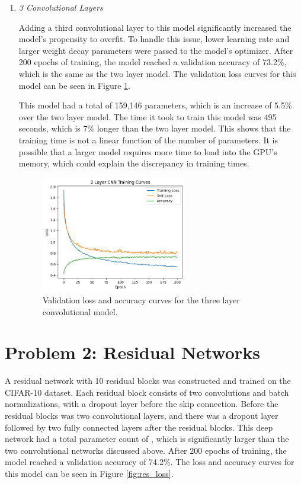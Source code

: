 \documentclass{article}
\begin{document}
\begin{enumerate}[label=\alph*. ]
     \item \textit{3 Convolutional Layers}

     Adding a third convolutional layer to this model significantly increased the model's propensity to overfit. To handle this issue, lower learning rate and larger weight decay parameters were passed to the model's optimizer. After 200 epochs of training, the model reached a validation accuracy of 73.2\%, which is the same as the two layer model. The validation loss curves for this model can be seen in Figure \ref{fig:conv_loss_b}.

     This model had a total of 159,146 parameters, which is an increase of 5.5\% over the two layer model. The time it took to train this model was 495 seconds, which is 7\% longer than the two layer model. This shows that the training time is not a linear function of the number of parameters. It is possible that a larger model requires more time to load into the GPU's memory, which could explain the discrepancy in training times.
    
     \begin{figure}[ht]
        \centering
        \includegraphics[width=0.6\textwidth]{output/graph1_b.png}
        \caption{Validation loss and accuracy curves for the three layer convolutional model.}
        \label{fig:conv_loss_b}
    \end{figure}
\end{enumerate}
\newpage
\section{Problem 2: Residual Networks}
A residual network with 10 residual blocks was constructed and trained on the CIFAR-10 dataset. Each residual block consists of two convolutions and batch normalizations, with a dropout layer before the skip connection. Before the residual blocks was two convolutional layers, and there was a dropout layer followed by two fully connected layers after the residual blocks. This deep network had a total parameter count of , which is significantly larger than the two convolutional networks discussed above. After 200 epochs of training, the model reached a validation accuracy of 74.2\%. The loss and accuracy curves for this model can be seen in Figure \ref{fig:res_loss}.
\end{document}
